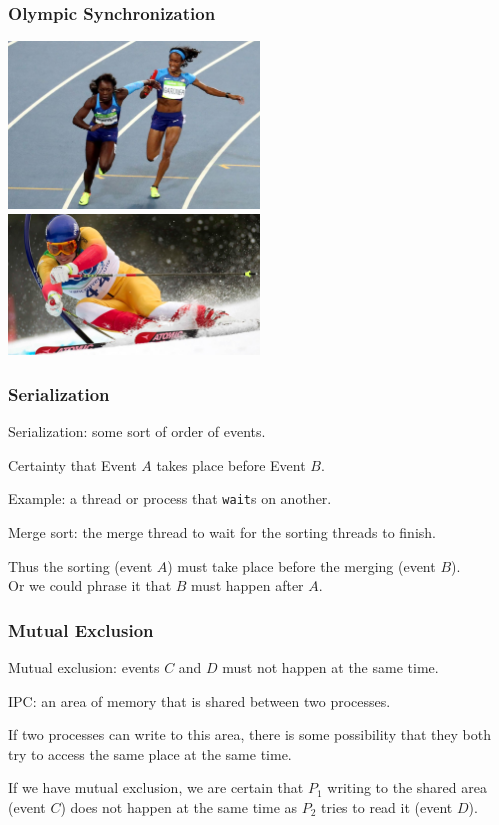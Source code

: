 \begin{frame}
	\frametitle{Olympic Synchronization}

	\begin{center}
		\includegraphics[width=0.5\textwidth]{images/baton-handoff.jpg}
		\includegraphics[width=0.5\textwidth]{images/skiing.jpg}
	\end{center}

\end{frame}


\begin{frame}
	\frametitle{Serialization}

	\alert{Serialization}: some sort of order of events.

	Certainty that Event $A$ takes place before Event $B$.

	Example: a thread or process that \texttt{wait}s on another.

	Merge sort: the merge thread to wait for the sorting threads to finish.

	Thus the sorting (event $A$) must take place before the merging (event $B$).\\
	\quad Or we could phrase it that $B$ must happen after $A$.


\end{frame}

\begin{frame}
	\frametitle{Mutual Exclusion}

	\alert{Mutual exclusion}: events $C$ and $D$ must not happen at the same time.

	IPC: an area of memory that is shared between two processes.

	If two processes can write to this area, there is some possibility that they both try to access the same place at the same time.

	If we have mutual exclusion, we are certain that $P_{1}$ writing to the shared area (event $C$) does not happen at the same time as $P_{2}$ tries to read it (event $D$).

\end{frame}

